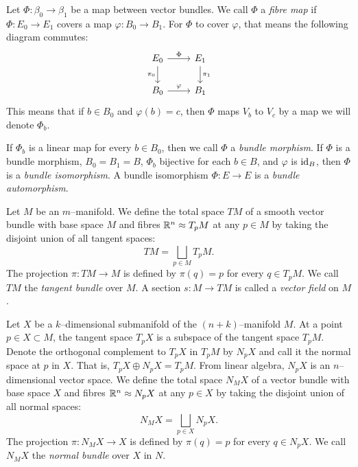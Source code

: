 \begin{defn}
	Let $\Phi:\beta_0\to \beta_1$ be a map between vector bundles.
	We call $\Phi$ a \emph{fibre map} if $\Phi:E_0\to E_1$ covers a map $\varphi:B_0\to B_1$.
	For $\Phi$ to cover $\varphi$, that means the following diagram commutes:
	\[
		\begin{tikzcd}
			E_0 \arrow{r}{\Phi} \arrow[swap]{d}{\pi_0} & E_1 \arrow{d}{\pi_1} \\
			B_0 \arrow{r}{\varphi} & B_1
		\end{tikzcd}
	\]
	This means that if $b\in B_0$ and $\varphi(b)=c$, then $\Phi$ maps $V_b$ to $V_c$ by a map we will denote $\Phi_b$.

	If $\Phi_b$ is a linear map for every $b\in B_0$, then we call $\Phi$ a \emph{bundle morphism}.
	If $\Phi$ is a bundle morphism, $B_0=B_1=B$, $\Phi_b$ bijective for each $b\in B$, and $\varphi$ is $\textrm{id}_{B}$, then $\Phi$ is a \emph{bundle isomorphism}.
	A bundle isomorphism $\Phi:E\to E$ is a \emph{bundle automorphism}.
\end{defn}

\begin{defn}
	Let $M$ be an $m$--manifold.
	We define the total space $TM$ of a smooth vector bundle with base space $M$ and fibres $\mathbb{R}^n\approx T_p M$ at any $p\in M$ by taking the disjoint union of all tangent spaces:
	\[
		TM = \bigsqcup_{p\in M} T_p M.
	\]
	The projection $\pi:TM\to M$ is defined by $\pi(q)=p$ for every $q\in T_p M$.
	We call $TM$ the \emph{tangent bundle} over $M$.
	A section $s:M\to TM$ is called a \emph{vector field} on $M$.
\end{defn}

\begin{defn}
	Let $X$ be a $k$--dimensional submanifold of the $(n+k)$--manifold $M$.
	At a point $p\in X\subset M$, the tangent space $T_p X$ is a subspace of the tangent space $T_p M$.
	Denote the orthogonal complement to $T_p X$ in $T_p M$ by $N_p X$ and call it the normal space at $p$ in $X$.
	That is, $T_p X\oplus N_p X = T_p M$.
	From linear algebra, $N_p X$ is an $n$--dimensional vector space.
	We define the total space $N_M X$ of a vector bundle with base space $X$ and fibres $\mathbb{R}^n\approx N_p X$ at any $p\in X$ by taking the disjoint union of all normal spaces:
	\[
		N_M X = \bigsqcup_{p\in X} N_p X.
	\]
	The projection $\pi:N_M X\to X$ is defined by $\pi(q)=p$ for every $q\in N_p X$.
	We call $N_M X$ the \emph{normal bundle} over $X$ in $N$.	
\end{defn}

